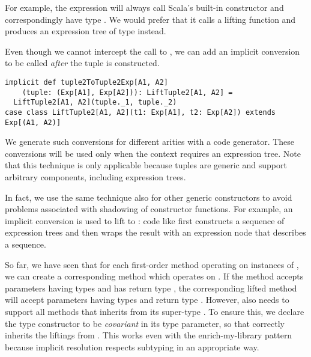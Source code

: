For example, the expression  will always call Scala's built-in  constructor and correspondingly have type . We would prefer that it calls a lifting function and produces an expression tree of type  instead.

Even though we cannot intercept the call to , we can add an implicit conversion to be called \emph{after} the tuple is constructed.

\begin{lstlisting}
implicit def tuple2ToTuple2Exp[A1, A2]
    (tuple: (Exp[A1], Exp[A2])): LiftTuple2[A1, A2] =
  LiftTuple2[A1, A2](tuple._1, tuple._2)
case class LiftTuple2[A1, A2](t1: Exp[A1], t2: Exp[A2]) extends Exp[(A1, A2)]
\end{lstlisting}

We generate such conversions for different arities with a code generator. These conversions will be used only when the context requires an expression tree. Note that this technique is only applicable because tuples are generic and support arbitrary components, including expression trees.

In fact, we use the same technique also for other generic constructors to avoid problems associated with shadowing of constructor functions. For example, an implicit conversion is used to lift  to : code like  first constructs a sequence of expression trees and then wraps the result with an expression node that describes a sequence.

So far, we have seen that for each first-order method  operating on instances of , we can create a corresponding method which operates on . If the method accepts parameters having types  and has return type , the corresponding lifted method will accept parameters having types  and return type . However,  also needs to support all methods that  inherits from its super-type . To ensure this, we declare the type constructor  to be \emph{covariant} in its type parameter, so that  correctly inherits the liftings from . This works even with the enrich-my-library pattern because implicit resolution respects subtyping in an appropriate way.

